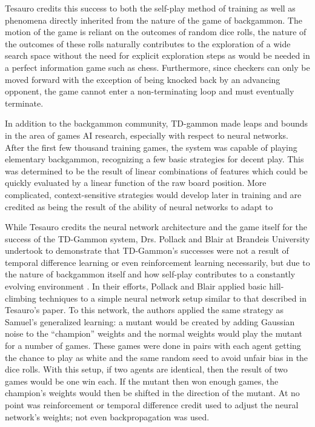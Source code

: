 Tesauro credits this success to both the self-play method of training
as well as phenomena directly inherited from the nature of the game of
backgammon.
%
The motion of the game is reliant on the outcomes of random dice rolls,
the nature of the outcomes of these rolls naturally contributes to the
exploration of a wide search space without the need for explicit exploration
steps as would be needed in a perfect information game such as chess.
%
Furthermore,
since checkers can only be moved forward
with the exception of being knocked back by an advancing opponent,
the game cannot enter a non-terminating loop and must eventually
terminate.

In addition to the backgammon community,
TD-gammon made leaps and bounds in the area of games AI research,
especially with respect to neural networks.
%
After the first few thousand training games,
the system was capable of playing elementary backgammon,
recognizing a few basic strategies for decent play.
%
This was determined to be the result of linear combinations of features which
could be quickly evaluated by a linear function of the raw board position.
%
More complicated, context-sensitive strategies would develop later in training
and are credited as being the result of the ability of neural networks to adapt
to


While Tesauro credits the neural network architecture and the game itself for
the success of the TD-Gammon system,
Drs. Pollack and Blair at Brandeis University undertook to demonstrate that
TD-Gammon's successes were not a result of
temporal difference learning
or even reinforcement learning necessarily,
but due to the nature of backgammon itself and how self-play contributes to a
constantly evolving environment
\cite{why-td-gammon}.
%
In their efforts,
Pollack and Blair applied basic hill-climbing techniques to a simple neural
network setup similar to that described in Tesauro's paper.
%
To this network,
the authors applied the same strategy as Samuel's generalized learning:
a mutant would be created by adding Gaussian noise to the ``champion'' weights
and the normal weights would play the mutant for a number of games.
%
These games were done in pairs with each agent getting the chance to play as
white and the same random seed to avoid unfair bias in the dice rolls.
%
With this setup,
if two agents are identical,
then the result of two games would be one win each.
%
If the mutant then won enough games,
the champion's weights would then be shifted in the direction of the mutant.
%
At no point was reinforcement or temporal difference credit used to adjust the
neural network's weights;
not even backpropagation was used.

